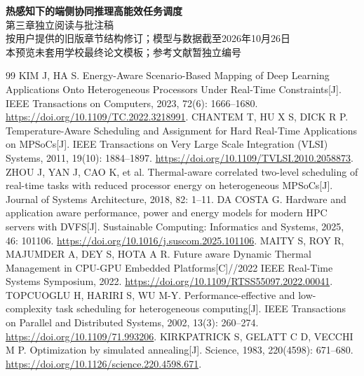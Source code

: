 \documentclass[UTF8,a4paper,12pt,openany,fontset=none]{ctexbook}
\begin{document}
\frontmatter
\begin{center}
  {\Large\bfseries 热感知下的端侧协同推理高能效任务调度}\\[8pt]
  {\large 第三章独立阅读与批注稿}\\[5pt]
  {\small 按用户提供的旧版章节结构修订；模型与数据截至2026年10月26日}\\[4pt]
  {\small 本预览未套用学校最终论文模板；参考文献暂独立编号}
\end{center}
\vspace{9pt}
\tableofcontents
\mainmatter
\setcounter{chapter}{2}

\clearpage
\begin{thebibliography}{99}
KIM J, HA S. Energy-Aware Scenario-Based Mapping of Deep Learning Applications Onto Heterogeneous Processors Under Real-Time Constraints[J].
IEEE Transactions on Computers, 2023, 72(6): 1666--1680.
\url{https://doi.org/10.1109/TC.2022.3218991}.
CHANTEM T, HU X S, DICK R P. Temperature-Aware Scheduling and Assignment for Hard Real-Time Applications on MPSoCs[J]. IEEE Transactions on Very Large Scale Integration (VLSI) Systems, 2011, 19(10): 1884--1897.
\url{https://doi.org/10.1109/TVLSI.2010.2058873}.
ZHOU J, YAN J, CAO K, et al. Thermal-aware correlated two-level scheduling of real-time tasks with reduced processor energy on heterogeneous MPSoCs[J]. Journal of Systems Architecture, 2018, 82: 1--11.
DA COSTA G. Hardware and application aware performance, power and energy models for modern HPC servers with DVFS[J]. Sustainable Computing: Informatics and Systems, 2025, 46: 101106.
\url{https://doi.org/10.1016/j.suscom.2025.101106}.
MAITY S, ROY R, MAJUMDER A, DEY S, HOTA A R. Future aware Dynamic Thermal Management in CPU-GPU Embedded Platforms[C]//2022 IEEE Real-Time Systems Symposium, 2022.
\url{https://doi.org/10.1109/RTSS55097.2022.00041}.
TOPCUOGLU H, HARIRI S, WU M-Y.
Performance-effective and low-complexity task scheduling for heterogeneous computing[J].
IEEE Transactions on Parallel and Distributed Systems, 2002, 13(3): 260--274.
\url{https://doi.org/10.1109/71.993206}.
KIRKPATRICK S, GELATT C D, VECCHI M P.
Optimization by simulated annealing[J].
Science, 1983, 220(4598): 671--680.
\url{https://doi.org/10.1126/science.220.4598.671}.
\end{thebibliography}
\end{document}
